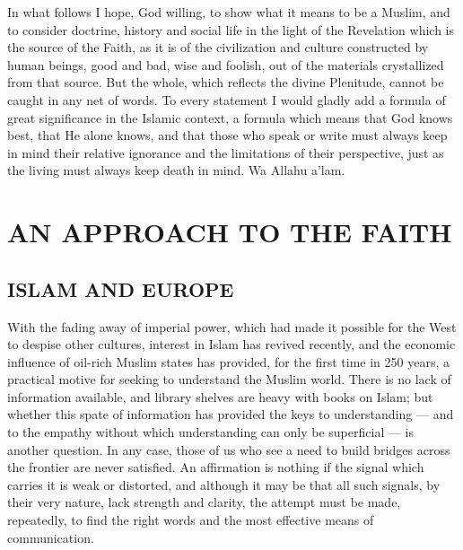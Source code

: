 \documentclass[10pt, twoside,openright]{book}
\begin{document}
In what follows I hope, God willing, to show what it means to be a Muslim, and to consider doctrine, history and social life in the light of the Revelation which is the source of the Faith, as it is of the civilization and culture constructed by human beings, good and bad, wise and foolish, out of the materials crystallized from that source. But the whole, which reflects the divine Plenitude, cannot be caught in any net of words. To every statement I would gladly add a formula of great significance in the Islamic context, a formula which means that God knows best, that He alone knows, and that those who speak or write must always keep in mind their relative ignorance and the limitations of their perspective, just as the living must always keep death in mind. Wa Allahu a'lam. \\


\mainmatter
{}

\part{AN APPROACH TO THE FAITH}

\chapter{ISLAM AND EUROPE}

With the fading away of imperial power, which had made it possible for the West to despise other cultures, interest in Islam has revived recently, and the economic influence of oil\hyp{}rich Muslim states has provided, for the first time in 250 years, a practical motive for seeking to understand the Muslim world. There is no lack of information available, and library shelves are heavy with books on Islam; but whether this spate of information has provided the keys to understanding --- and to the empathy without which understanding can only be superficial --- is another question. In any case, those of us who see a need to build bridges across the frontier are never satisfied. An affirmation is nothing if the signal which carries it is weak or distorted, and although it may be that all such signals, by their very nature, lack strength and clarity, the attempt must be made, repeatedly, to find the right words and the most effective means of communication. \\
\end{document}
